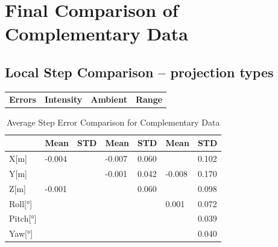 {{        
    }
    
\section{Final Comparison of Complementary Data}{

    \subsection{Local Step Comparison – projection types}{

    \begin{tabular}{p{2cm} p{3.5cm} p{3.5cm} p{2cm}}
        \textbf{Errors} & \textbf{Intensity} & \textbf{Ambient} & \textbf{Range}
    \end{tabular}

    \begin{table}[!ht]
        \setlength{\extrarowheight}{5pt}
        \centering
        \large
        \begin{tabular}{p{1.3cm}| p{1.5cm} p{1.5cm}| p{1.5cm} p{1.5cm}| p{1.5cm} p{1.5cm}}
            \hline
                & Mean & STD & Mean & STD & Mean & STD\\[12pt]
            \hline
            X[m] & -0.004 & \text{\color{Cyan}{0.056}} & -0.007 & 0.060 & \text{\color{Green}{-0.002}} & 0.102\\[3pt]
            \hline
            Y[m] & \text{\color{Green}{0}} & \text{\color{Cyan}{0.040}} & -0.001 & 0.042 & -0.008 & 0.170\\[3pt]
            \hline
            Z[m] & -0.001 & \text{\color{Cyan}{0.058}} & \text{\color{Green}{0}} & 0.060 & \text{\color{Green}{0}} & 0.098\\[3pt]
            \hline
            Roll[°] & \text{\color{Green}{0}} & \text{\color{Cyan}{0.024}} & \text{\color{Green}{0}} & \text{\color{Cyan}{0.024}} & 0.001 & 0.072\\[3pt]
            \hline
            Pitch[°] & \text{\color{Green}{0}} & \text{\color{Cyan}{0.024}} & \text{\color{Green}{0}} & \text{\color{Cyan}{0.024}} & \text{\color{Green}{0}} & 0.039\\[3pt]
            \hline
            Yaw[°] & \text{\color{Green}{0}} & \text{\color{Cyan}{0.029}} & \text{\color{Green}{0}} & \text{\color{Cyan}{0.029}} & \text{\color{Green}{0}} & 0.040\\[3pt]
        \end{tabular}
        \caption{Average Step Error Comparison for Complementary Data}
        \label{tab:step_errors_data}
    \end{table}

}}}
